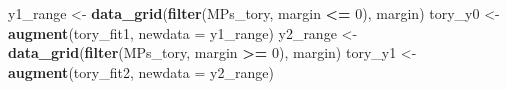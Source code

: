 \documentclass[]{book}
\newenvironment{Shaded}{\begin{snugshade}}{\end{snugshade}}
\newcommand{\DataTypeTok}[1]{\textcolor[rgb]{0.13,0.29,0.53}{#1}}
\newcommand{\DecValTok}[1]{\textcolor[rgb]{0.00,0.00,0.81}{#1}}
\newcommand{\KeywordTok}[1]{\textcolor[rgb]{0.13,0.29,0.53}{\textbf{#1}}}
\newcommand{\NormalTok}[1]{#1}
\newcommand{\OperatorTok}[1]{\textcolor[rgb]{0.81,0.36,0.00}{\textbf{#1}}}
\newcommand{\StringTok}[1]{\textcolor[rgb]{0.31,0.60,0.02}{#1}}
\theoremstyle{definition}
\theoremstyle{definition}
\theoremstyle{definition}
\theoremstyle{remark}
\begin{document}
\begin{Shaded}
\begin{Highlighting}[]
\NormalTok{y1_range <-}\StringTok{ }\KeywordTok{data_grid}\NormalTok{(}\KeywordTok{filter}\NormalTok{(MPs_tory, margin }\OperatorTok{<=}\StringTok{ }\DecValTok{0}\NormalTok{), margin)}
\NormalTok{tory_y0 <-}\StringTok{ }\KeywordTok{augment}\NormalTok{(tory_fit1, }\DataTypeTok{newdata =}\NormalTok{ y1_range)}
\NormalTok{y2_range <-}\StringTok{ }\KeywordTok{data_grid}\NormalTok{(}\KeywordTok{filter}\NormalTok{(MPs_tory, margin }\OperatorTok{>=}\StringTok{ }\DecValTok{0}\NormalTok{), margin)}
\NormalTok{tory_y1 <-}\StringTok{ }\KeywordTok{augment}\NormalTok{(tory_fit2, }\DataTypeTok{newdata =}\NormalTok{ y2_range)}
\end{Highlighting}
\end{Shaded}
\end{document}
